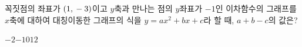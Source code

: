 꼭짓점의 좌표가 $(1{,}\mkern3mu -3)$이고 $y$축과 만나는 점의 $y$좌표가 $-1$인 이차함수의 그래프를 $x$축에 대하여 대칭이동한 그래프의 식을 $y=ax^2+bx+c$라 할 때, $a+b-c$의 값은? 
\begin{choices32}{$-2$}{$-1$}{$0$}{$1$}{$2$}\end{choices32}
